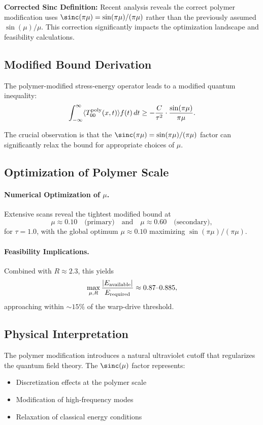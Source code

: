 \documentclass[11pt]{article}
\begin{document}
\textbf{Corrected Sinc Definition:} Recent analysis reveals the correct polymer modification uses $\sinc(\pi\mu) = \sin(\pi\mu)/(\pi\mu)$ rather than the previously assumed $\sin(\mu)/\mu$. This correction significantly impacts the optimization landscape and feasibility calculations.

\subsection*{Modified Bound Derivation}
The polymer-modified stress-energy operator leads to a modified quantum inequality:
\[
  \int_{-\infty}^{\infty} \langle T_{00}^{\rm poly}(x,t) \rangle f(t)\,dt \geq -\frac{C}{\tau^2} \cdot \frac{\sin(\pi\mu)}{\pi\mu}.
\]

The crucial observation is that the $\sinc(\pi\mu) = \sin(\pi\mu)/(\pi\mu)$ factor can significantly relax the bound for appropriate choices of $\mu$.

\subsection*{Optimization of Polymer Scale}
\paragraph{Numerical Optimization of $\mu$.}
Extensive scans reveal the tightest modified bound at
\[
  \mu \approx 0.10 \quad\text{(primary)} \quad\text{and}\quad \mu \approx 0.60 \quad\text{(secondary)},
\]
for $\tau=1.0$, with the global optimum $\mu\approx0.10$ maximizing $\sin(\pi\mu)/(\pi\mu)$.  

\paragraph{Feasibility Implications.}
Combined with $R \approx 2.3$, this yields
\[
  \max_{\mu,R}\frac{|E_{\rm available}|}{E_{\rm required}} \approx 0.87\text{--}0.885,
\]
approaching within $\sim15\%$ of the warp‐drive threshold.

\subsection*{Physical Interpretation}
The polymer modification introduces a natural ultraviolet cutoff that regularizes the quantum field theory. The $\sinc(\mu)$ factor represents:
\begin{itemize}
  \item Discretization effects at the polymer scale
  \item Modification of high-frequency modes
  \item Relaxation of classical energy conditions
\end{itemize}
\end{document}
